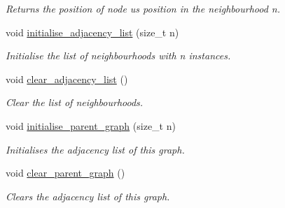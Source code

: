 \begin{DoxyCompactItemize}
\begin{DoxyCompactList}\small\item\em Returns the position of node {\itshape u\textquotesingle{}s} position in the neighbourhood {\itshape n}. \end{DoxyCompactList}\item 
\mbox{\label{classlgraph_1_1xxgraph_a682d586f850add8b7e637aeea81b0292}} 
void \hyperlink{classlgraph_1_1xxgraph_a682d586f850add8b7e637aeea81b0292}{initialise\+\_\+adjacency\+\_\+list} (size\+\_\+t n)
\begin{DoxyCompactList}\small\item\em Initialise the list of neighbourhoods with {\itshape n} instances. \end{DoxyCompactList}\item 
\mbox{\label{classlgraph_1_1xxgraph_a6b15c62c68919722f7eb18fe273d45fe}} 
void \hyperlink{classlgraph_1_1xxgraph_a6b15c62c68919722f7eb18fe273d45fe}{clear\+\_\+adjacency\+\_\+list} ()
\begin{DoxyCompactList}\small\item\em Clear the list of neighbourhoods. \end{DoxyCompactList}\item 
void \hyperlink{classlgraph_1_1xxgraph_a50c658dd39e6b1d38bf7e514daa2f33c}{initialise\+\_\+parent\+\_\+graph} (size\+\_\+t n)
\begin{DoxyCompactList}\small\item\em Initialises the adjacency list of this graph. \end{DoxyCompactList}\item 
void \hyperlink{classlgraph_1_1xxgraph_a4122495066e4402cbf6d2d9bb82d54cc}{clear\+\_\+parent\+\_\+graph} ()
\begin{DoxyCompactList}\small\item\em Clears the adjacency list of this graph. \end{DoxyCompactList}\end{DoxyCompactItemize}
